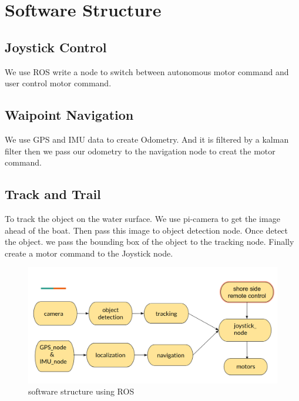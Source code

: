\section{Software Structure}

\subsection{Joystick Control}

We use ROS write a node to switch between autonomous motor command and user control motor command.

\subsection{Waipoint Navigation}

We use GPS and IMU data to create Odometry. And it is filtered by a kalman filter then we pass our odometry to the navigation node to creat the motor command.

\subsection{Track and Trail}

To track the object on the water surface. We use pi-camera to get the image ahead of the boat. Then pass this image to object detection node. Once detect the object. we pass the bounding box of the object to the tracking node. Finally create a motor command to the Joystick node.

\begin{figure}[h]
	\includegraphics[width=0.8\columnwidth]{images/software_structure.png}
	\centering
	\caption{software structure using ROS}
	\label{figure:software_structure}
\end{figure}